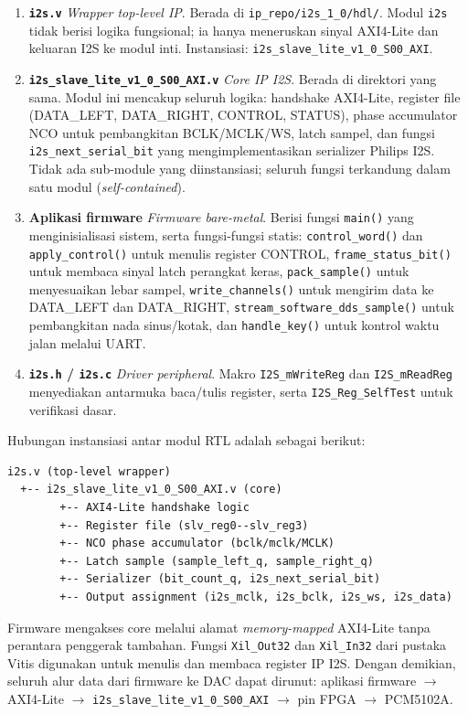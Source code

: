 \begin{enumerate}
    \item \textbf{\texttt{i2s.v}} \textit{Wrapper top-level IP}. Berada di \texttt{ip\_repo/i2s\_1\_0/hdl/}. Modul \texttt{i2s} tidak berisi logika fungsional; ia hanya meneruskan sinyal AXI4-Lite dan keluaran I2S ke modul inti. Instansiasi: \texttt{i2s\_slave\_lite\_v1\_0\_S00\_AXI}.
    \item \textbf{\texttt{i2s\_slave\_lite\_v1\_0\_S00\_AXI.v}} \textit{Core IP I2S}. Berada di direktori yang sama. Modul ini mencakup seluruh logika: handshake AXI4-Lite, register file (DATA\_LEFT, DATA\_RIGHT, CONTROL, STATUS), phase accumulator NCO untuk pembangkitan BCLK/MCLK/WS, latch sampel, dan fungsi \texttt{i2s\_next\_serial\_bit} yang mengimplementasikan serializer Philips I2S. Tidak ada sub-module yang diinstansiasi; seluruh fungsi terkandung dalam satu modul (\textit{self-contained}).
    \item \textbf{Aplikasi firmware} \textit{Firmware bare-metal}. Berisi fungsi \texttt{main()} yang menginisialisasi sistem, serta fungsi-fungsi statis: \texttt{control\_word()} dan \texttt{apply\_control()} untuk menulis register CONTROL, \texttt{frame\_status\_bit()} untuk membaca sinyal latch perangkat keras, \texttt{pack\_sample()} untuk menyesuaikan lebar sampel, \texttt{write\_channels()} untuk mengirim data ke DATA\_LEFT dan DATA\_RIGHT, \texttt{stream\_software\_dds\_sample()} untuk pembangkitan nada sinus/kotak, dan \texttt{handle\_key()} untuk kontrol waktu jalan melalui UART.
    \item \textbf{\texttt{i2s.h} / \texttt{i2s.c}} \textit{Driver peripheral}. Makro \texttt{I2S\_mWriteReg} dan \texttt{I2S\_mReadReg} menyediakan antarmuka baca/tulis register, serta \texttt{I2S\_Reg\_SelfTest} untuk verifikasi dasar.
\end{enumerate}

Hubungan instansiasi antar modul RTL adalah sebagai berikut:

\begin{verbatim}
i2s.v (top-level wrapper)
  +-- i2s_slave_lite_v1_0_S00_AXI.v (core)
        +-- AXI4-Lite handshake logic
        +-- Register file (slv_reg0--slv_reg3)
        +-- NCO phase accumulator (bclk/mclk/MCLK)
        +-- Latch sample (sample_left_q, sample_right_q)
        +-- Serializer (bit_count_q, i2s_next_serial_bit)
        +-- Output assignment (i2s_mclk, i2s_bclk, i2s_ws, i2s_data)
\end{verbatim}

Firmware mengakses core melalui alamat \textit{memory-mapped} AXI4-Lite tanpa perantara penggerak tambahan. Fungsi \texttt{Xil\_Out32} dan \texttt{Xil\_In32} dari pustaka Vitis digunakan untuk menulis dan membaca register IP I2S. Dengan demikian, seluruh alur data dari firmware ke DAC dapat dirunut: aplikasi firmware $\rightarrow$ AXI4-Lite $\rightarrow$ \texttt{i2s\_slave\_lite\_v1\_0\_S00\_AXI} $\rightarrow$ pin FPGA $\rightarrow$ PCM5102A.

